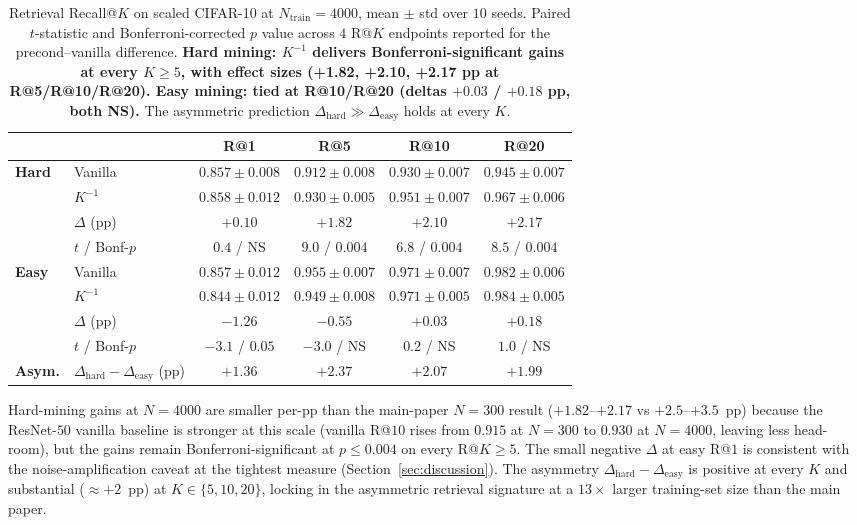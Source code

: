 \documentclass{article}
\begin{document}
\begin{table}[!htbp]
\centering
\small
\caption{Retrieval Recall@$K$ on scaled CIFAR-10 at
$N_{\mathrm{train}}=4000$, mean $\pm$ std over $10$ seeds. Paired
$t$-statistic and Bonferroni-corrected $p$ value across $4$ R@$K$
endpoints reported for the precond--vanilla difference. \textbf{Hard
mining: $K^{-1}$ delivers Bonferroni-significant gains at every $K\geq 5$,
with effect sizes (\textbf{+1.82}, \textbf{+2.10}, \textbf{+2.17} pp at
R@5/R@10/R@20). Easy
mining: tied at R@10/R@20 (deltas $+0.03$ / $+0.18$ pp, both
NS).} The asymmetric prediction
$\Delta_{\mathrm{hard}}\gg\Delta_{\mathrm{easy}}$ holds at every $K$.}
\label{tab:scaled}
\begin{tabular}{llcccc}
\toprule
& & R@1 & R@5 & R@10 & R@20 \\
\midrule
\multirow{4}{*}{\textbf{Hard}}
 & Vanilla       & $0.857\pm0.008$ & $0.912\pm0.008$ & $0.930\pm0.007$ & $0.945\pm0.007$ \\
 & $K^{-1}$      & $0.858\pm0.012$ & $0.930\pm0.005$ & $0.951\pm0.007$ & $0.967\pm0.006$ \\
 & $\Delta$ (pp) & $+0.10$ & $+1.82$ & $+2.10$ & $+2.17$ \\
 & $t$ / Bonf-$p$ & $0.4$ / NS & $9.0$ / $\mathbf{0.004}$ & $6.8$ / $\mathbf{0.004}$ & $8.5$ / $\mathbf{0.004}$ \\
\midrule
\multirow{4}{*}{\textbf{Easy}}
 & Vanilla       & $0.857\pm0.012$ & $0.955\pm0.007$ & $0.971\pm0.007$ & $0.982\pm0.006$ \\
 & $K^{-1}$      & $0.844\pm0.012$ & $0.949\pm0.008$ & $0.971\pm0.005$ & $0.984\pm0.005$ \\
 & $\Delta$ (pp) & $-1.26$ & $-0.55$ & $+0.03$ & $+0.18$ \\
 & $t$ / Bonf-$p$ & $-3.1$ / $0.05$ & $-3.0$ / NS & $0.2$ / NS & $1.0$ / NS \\
\midrule
\textbf{Asym.} & $\Delta_{\mathrm{hard}}-\Delta_{\mathrm{easy}}$ (pp)
              & $+1.36$ & $+2.37$ & $+2.07$ & $+1.99$ \\
\bottomrule
\end{tabular}
\end{table}

Hard-mining gains at $N{=}4000$ are smaller per-pp than the
main-paper $N{=}300$ result ($+1.82$--$+2.17$ vs $+2.5$--$+3.5$~pp)
because the ResNet-$50$ vanilla baseline is stronger at this scale
(vanilla R@$10$ rises from $0.915$ at $N{=}300$ to $0.930$ at
$N{=}4000$, leaving less head-room), but the gains remain
Bonferroni-significant at $p\!\le\!0.004$ on every R@$K\!\geq\!5$.
The small negative $\Delta$ at easy R@$1$ is consistent with the
noise-amplification caveat at the tightest measure
(Section~\ref{sec:discussion}). The asymmetry
$\Delta_{\mathrm{hard}}-\Delta_{\mathrm{easy}}$ is positive at every
$K$ and substantial ($\approx +2$~pp) at $K\in\{5,10,20\}$, locking
in the asymmetric retrieval signature at a $13\times$ larger
training-set size than the main paper.
\end{document}
